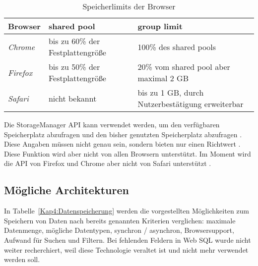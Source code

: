 \begin{table}
  \renewcommand{\arraystretch}{1.2}
  \centering
  \sffamily
  \begin{footnotesize}
    \begin{tabular}{l l l}
      \toprule
      \textbf{Browser} & \textbf{shared pool} & \textbf{group limit} \\
      \midrule
      \emph{Chrome} & bis zu 60\% der Festplattengröße & 100\% des shared pools \\
      \emph{Firefox} & bis zu 50\% der Festplattengröße & 20\% vom shared pool aber maximal 2 \ac{GB} \\
      \emph{Safari} & nicht bekannt & bis zu 1 \ac{GB}, durch Nutzerbestätigung erweiterbar \\
      \bottomrule
    \end{tabular}
  \end{footnotesize}
  \rmfamily
  \caption{Speicherlimits der Browser}
  \label{Kap4:Speicherlimits}
\end{table}

Die StorageManager \ac{API} kann verwendet werden, um den verfügbaren Speicherplatz abzufragen und den bisher genutzten Speicherplatz abzufragen \autocite{storage-for-the-web}. Diese Angaben müssen nicht genau sein, sondern bieten nur einen Richtwert \autocite{storage-for-the-web}. Diese Funktion wird aber nicht von allen Browsern unterstützt. Im Moment wird die \ac{API} von Firefox und Chrome aber nicht von Safari unterstützt \autocite{mdn-storage-api}.

\subsection{Mögliche Architekturen}
In Tabelle~\ref{Kap4:Datenspeicherung} werden die vorgestellten Möglichkeiten zum Speichern von Daten nach bereits genannten Kriterien verglichen: maximale Datenmenge, mögliche Datentypen, synchron / asynchron, Browsersupport, Aufwand für Suchen und Filtern. Bei fehlenden Feldern in Web SQL wurde nicht weiter recherchiert, weil diese Technologie veraltet ist und nicht mehr verwendet werden soll.

